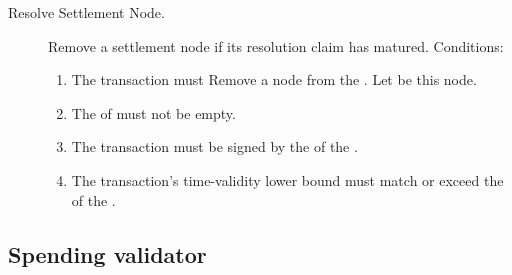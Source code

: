 \documentclass[../midgard.tex]{subfiles}
\begin{document}
\begin{description}
\begin{enumerate}
      \end{enumerate}
  \item[Resolve Settlement Node.] Remove a settlement node if its resolution claim has matured.
    Conditions:
      \begin{enumerate}
        \item The transaction must Remove a node from the .
          Let  be this node.
        \item The  of  must not be empty.
        \item The transaction must be signed by the  of the .
        \item The transaction's time-validity lower bound must match or exceed the  of the .
      \end{enumerate}
\end{description}

\subsection{Spending validator}
\label{h:settlement-queue-spending-validator}
\end{document}
